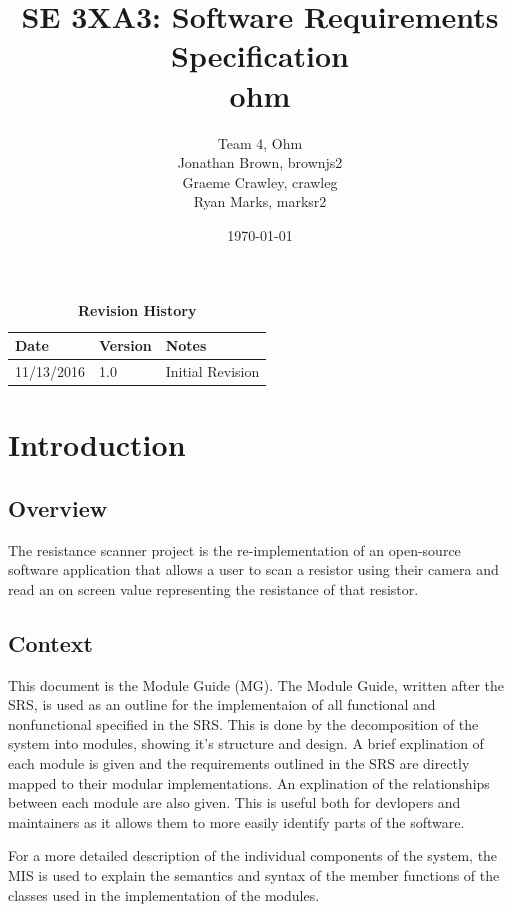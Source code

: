 \documentclass[12pt, titlepage]{article}
\title{SE 3XA3: Software Requirements Specification\\ ohm}
\author{Team 4, Ohm
		\\ Jonathan Brown, brownjs2
		\\ Graeme Crawley, crawleg
		\\ Ryan Marks, marksr2
}
\date{\today}
\begin{document}
\maketitle

\begin{table}[h]
\caption{\bf Revision History}
\begin{tabularx}{\textwidth}{p{3cm}p{2cm}X}
\toprule {\bf Date} & {\bf Version} & {\bf Notes}\\
\midrule
11/13/2016 & 1.0 & Initial Revision\\
\bottomrule
\end{tabularx}
\end{table}

\newpage
{}
\tableofcontents
\listoftables
\listoffigures



\newpage


\section{Introduction}
\subsection{Overview}
The resistance scanner project is the re-implementation of an open-source software application that allows a user to scan a resistor using their camera and read an on screen value representing the resistance of that resistor.

\subsection{Context}
\par This document is the Module Guide (MG). The Module Guide, written after the SRS, is used as an outline for the implementaion of all functional and nonfunctional specified in the SRS. This is done by the decomposition of the system into modules, showing it's structure and design. A brief explination of each module is given and the requirements outlined in the SRS are directly mapped to their modular implementations. An explination of the relationships between each module are also given. This is useful both for devlopers and maintainers as it allows them to more easily identify parts of the software.
\par For a more detailed description of the individual components of the system, the MIS is used to explain the semantics and syntax of the member functions of the classes used in the implementation of the modules.
\end{document}

